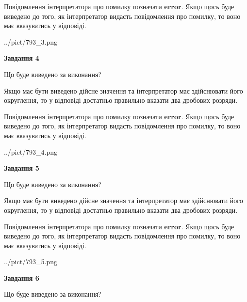 \documentclass[12pt, ukrainian]{article}
\begin{document}
{\begin {Large}
Повідомлення інтерпретатора про помилку позначати \textbf{error}.
Якщо щось буде виведено до того, як інтерпретатор видасть повідомлення про помилку, 
то воно має вказуватись у відповіді. \par

\begin{center}
	{../pict/793_3.png}
\end{center}
\newpage

{\begin {center}\textbf{Завдання 4}\end {center}}\par
Що буде виведено за виконання? \par

Якщо має бути виведено дійсне значення та інтерпретатор має здійснювати його округлення, 
то у відповіді достатньо правильно вказати два дробових розряди.

Повідомлення інтерпретатора про помилку позначати \textbf{error}.
Якщо щось буде виведено до того, як інтерпретатор видасть повідомлення про помилку, 
то воно має вказуватись у відповіді. \par

\begin{center}
	{../pict/793_4.png}
\end{center}
\newpage

{\begin {center}\textbf{Завдання 5}\end {center}}\par
Що буде виведено за виконання? \par

Якщо має бути виведено дійсне значення та інтерпретатор має здійснювати його округлення, 
то у відповіді достатньо правильно вказати два дробових розряди.

Повідомлення інтерпретатора про помилку позначати \textbf{error}.
Якщо щось буде виведено до того, як інтерпретатор видасть повідомлення про помилку, 
то воно має вказуватись у відповіді. \par

\begin{center}
	{../pict/793_5.png}
\end{center}
\newpage

{\begin {center}\textbf{Завдання 6}\end {center}}\par
Що буде виведено за виконання? \par


\end{Large}}
\end{document}
